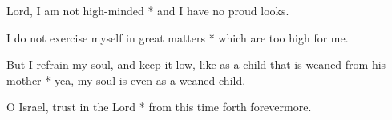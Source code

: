 \begin{multicols}{2}
	
	Lord, I am not high-minded * and I have no proud looks.
	
	I do not exercise myself in great matters * which are too high for me.
	
	But I refrain my soul, and keep it low, like as a child that is weaned from his mother * yea, my soul is even as a weaned child.
	
	O Israel, trust in the Lord * from this time forth forevermore.
	
	\gloria{}
\end{multicols}